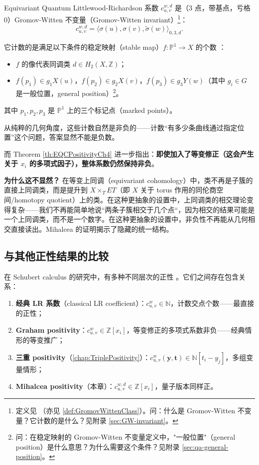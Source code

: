 Equivariant Quantum Littlewood-Richardson 系数 $c_{u,v}^{w,d}$ 是（3 点，带基点，亏格 0）Gromov-Witten 不变量（Gromov-Witten invariant）\footnote{定义见 \cite[Definition 1.2]{Mihalcea}（亦见 \cref{def:GromovWittenClass}）。问：什么是 Gromov-Witten 不变量？它计数的是什么？见附录 \cref{sec:GW-invariant}。}：
$$c_{u,v}^{w,d} = \langle \sigma(u), \sigma(v), \widetilde{\sigma}(w) \rangle_{0,3,d}.$$

它计数的是满足以下条件的稳定映射（stable map）$f: \mathbb{P}^1 \to X$ 的个数 \cite[Example 1.2.1]{FultonQuntum1997}：
\begin{itemize}
\item $f$ 的像代表同调类 $d \in H_2(X, \mathbb{Z})$；
\item $f(p_1) \in g_1 X(u)$，$f(p_2) \in g_2 X(v)$，$f(p_3) \in g_3 Y(w)$（其中 $g_i \in G$ 是一般位置，general position）\footnote{问：在稳定映射的 Gromov-Witten 不变量定义中，"一般位置"（general position）是什么意思？为什么需要这个条件？见附录 \cref{sec:qa-general-position}。}。
\end{itemize}
其中 $p_1, p_2, p_3$ 是 $\mathbb{P}^1$ 上的三个标记点（marked points）。

从纯粹的几何角度，这些计数自然是非负的——计数``有多少条曲线通过指定位置''这个问题，答案显然不能是负数。

而 Theorem \cref{th:EQCPositivityCh4} 进一步指出：\textbf{即使加入了等变修正（这会产生关于 $x_i$ 的多项式因子），整体系数仍然保持非负}。

\textbf{为什么这不显然？} 在等变上同调（equivariant cohomology）中，类不再是子簇的直接上同调类，而是提升到 $X \times_T ET$（即 $X$ 关于 torus 作用的同伦商空间/homotopy quotient）上的类。在这种更抽象的设置中，上同调类的相交理论变得复杂——我们不再能简单地说``两条子簇相交于几个点``，因为相交的结果可能是一个上同调类，而不是一个数字。在这种更抽象的设置中，非负性不再能从几何相交直接读出。Mihalcea 的证明揭示了隐藏的统一结构。

\subsection{与其他正性结果的比较}

在 Schubert calculus 的研究中，有多种不同层次的正性 \cite{knutson2003,FultonQuntum1997}。它们之间存在包含关系：

\begin{enumerate}
\item \textbf{经典 LR 系数}（classical LR coefficient）：$c_{u,v}^w \in \mathbb{N}$，计数交点个数——最直接的正性；
\item \textbf{Graham positivity}：$c_{u,v}^w \in \mathbb{Z}[x_i]$，等变修正的多项式系数非负——经典情形的等变推广；
\item \textbf{三重 positivity}（\cref{chap:TriplePositivity}）：$c_{u,v}^w(\mathbf{y}, \mathbf{t}) \in \mathbb{N}[t_i - y_j]$，多组变量情形；
\item \textbf{Mihalcea positivity}（本章）：$c_{u,v}^{w,d} \in \mathbb{Z}[x_i]$，量子版本同样正。
\end{enumerate}

